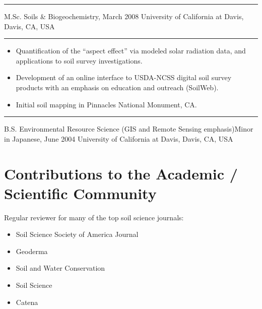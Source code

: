 \documentclass[overlapped,line,10pt,letterpaper]{res}
\begin{document}
\begin{resume}
\begin{minipage}{0.95\textwidth}
\begin{itemize}[itemsep=0.05cm,leftmargin=*]
\end{itemize}
\vspace{0.125cm}
\hrule
\end{minipage}

M.Sc. Soils \& Biogeochemistry, March 2008 \newline
University of California at Davis, Davis, CA, USA
\\
\begin{minipage}{0.95\textwidth}
\hrule
\begin{itemize}[itemsep=0.05cm,leftmargin=*]
\small
\vspace{0.125cm}
	
	\item Quantification of the ``aspect effect'' via modeled solar radiation data, and applications to soil survey investigations.
	
	\item Development of an online interface to USDA-NCSS digital soil survey products with an emphasis on education and outreach (SoilWeb).
	
	\item Initial soil mapping in Pinnacles National Monument, CA.
	
\end{itemize}
\vspace{0.125cm}
\hrule
\end{minipage}

B.S. Environmental Resource Science (GIS and Remote Sensing emphasis)\newline Minor in Japanese, June 2004 \newline
University of California at Davis, Davis, CA, USA

\section{\bf Contributions to the Academic / Scientific Community}
Regular reviewer for many of the top soil science journals:
\begin{itemize}[itemsep=0.05cm]
	\small
	\item Soil Science Society of America Journal
	\item Geoderma
	\item Soil and Water Conservation
	\item Soil Science
	\item Catena
\end{itemize}


\end{resume}
\end{document}

